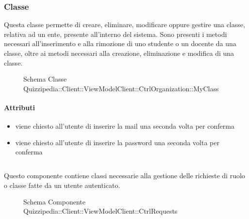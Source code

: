 \subsubsection{Classe }
Questa classe permette di creare, eliminare, modificare oppure gestire una classe, relativa ad un ente, presente all'interno del sistema.
Sono presenti i metodi necessari all'inserimento e alla rimozione di uno studente o un docente da una classe, oltre ai metodi necessari alla creazione, eliminazione e modifica di una classe.
\begin{figure}[H]
\centering
\noindent{}
\caption[Schema Classe MyClass]{Schema Classe Quizzipedia::Client::ViewModelClient::CtrlOrganization::MyClass}
\end{figure}
\paragraph{Attributi}
\begin{itemize}
\item {}
\newline
viene chiesto all'utente di inserire la mail una seconda volta per conferma
\item {}
\newline
viene chiesto all'utente di inserire la password una seconda volta per conferma
\end{itemize}
\subsection{}
Questo componente contiene classi necessarie alla gestione delle richieste di ruolo o classe fatte da un utente autenticato.
\begin{figure}[H]
\centering
\noindent{}
\caption[Schema Componente Quizzipedia::Client::ViewModelClient::CtrlRequests]{Schema Componente Quizzipedia::Client::ViewModelClient::CtrlRequests}
\end{figure}
